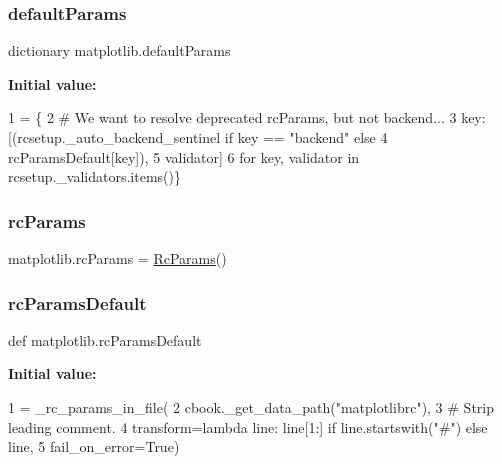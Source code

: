 \subsubsection{\texorpdfstring{default\+Params}{defaultParams}}
{\footnotesize\ttfamily dictionary matplotlib.\+default\+Params}

{\bfseries Initial value\+:}
\begin{DoxyCode}
1 =  \{
2         \textcolor{comment}{# We want to resolve deprecated rcParams, but not backend...}
3         key: [(rcsetup.\_auto\_backend\_sentinel \textcolor{keywordflow}{if} key == \textcolor{stringliteral}{"backend"} \textcolor{keywordflow}{else}
4                rcParamsDefault[key]),
5               validator]
6         \textcolor{keywordflow}{for} key, validator \textcolor{keywordflow}{in} rcsetup.\_validators.items()\}
\end{DoxyCode}
\mbox{\label{namespacematplotlib_a685c63e0405a4ac508c17ce26dd0f92e}} 
\subsubsection{\texorpdfstring{rc\+Params}{rcParams}}
{\footnotesize\ttfamily matplotlib.\+rc\+Params = \hyperlink{classmatplotlib_1_1RcParams}{Rc\+Params}()}

\mbox{\label{namespacematplotlib_a306b794e30fdab5ad5cb2adcc6e3ec43}} 
\subsubsection{\texorpdfstring{rc\+Params\+Default}{rcParamsDefault}}
{\footnotesize\ttfamily def matplotlib.\+rc\+Params\+Default}

{\bfseries Initial value\+:}
\begin{DoxyCode}
1 =  \_rc\_params\_in\_file(
2     cbook.\_get\_data\_path(\textcolor{stringliteral}{"matplotlibrc"}),
3     \textcolor{comment}{# Strip leading comment.}
4     transform=\textcolor{keyword}{lambda} line: line[1:] \textcolor{keywordflow}{if} line.startswith(\textcolor{stringliteral}{"#"}) \textcolor{keywordflow}{else} line,
5     fail\_on\_error=\textcolor{keyword}{True})
\end{DoxyCode}
\mbox{\label{namespacematplotlib_aea67c86e719473e3b271b493e7e39ef9}} 
